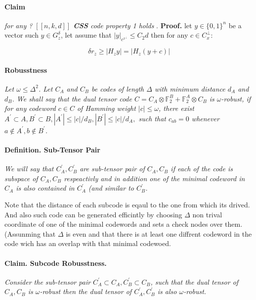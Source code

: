 \documentclass{article}
\newcommand{\Gz}{ G_{z}^{\delta} }
\begin{document}
\begin{multicols*}{2}
	\paragraph{Claim} \textit{ for any ?  $ \left[ \left[ n,k,d \right] \right] $ \textbf{CSS} code property 1 holds }. 
\textbf{Proof.} let $y \in \{0,1\}^{n}$ be a vector such $ y \in \Gz $, let assume that $|y|_{c^{x^{\perp}}} \le C_{2} d$ then for any $ c \in C_{x}^{\perp}$: 

\begin{equation*}
    \delta r_z \ge | H_{z} y | = | H_{z} \left( y + c \right) |  
\end{equation*}
\paragraph{Robusstness} \textit{ Let $ \omega \le \Delta^{2}$. Let $C_{A}$ and $C_{B}$ be codes of length $\Delta$ with minimum distance $d_{A}$ and $d_{B}$. We shall say that the dual tensor code $C = C_{A}\otimes \mathbb{F}^{B}_{2} + \mathbb{F}^{A}_{2} \otimes C_{B}$ is $\omega$-robust, if for any codeword $c\in C$ of Hamming weight $|c|\le \omega$, there exist $A^{\prime}\subset A, B^{\prime}\subset B, |A^{\prime}|\le |c|/d_{B}, |B^{\prime}|\le |c|/d_{A},$ such that $c_{ab}=0$ whenever $a \notin A^{\prime}, b \notin B^{\prime}$.} 
\paragraph{Definition. Sub-Tensor Pair} \textit{ We will say that $C_{A}^{\prime}, C_{B}^{\prime}$ are sub-tensor pair of $C_A,C_B$ if each of the code is subspace of $C_A, C_B$ respeactivly and in addition one of the  minimal codeword in $C_{A}$ is also contained in $C_{A}^{\prime}$ (and similar to $C_{B}^{\prime}$.}

  Note that the distance of each subcode is eqaul to the one from which its drived. And also such code can be generated efficintly by choosing $\Delta$ non trival coordinate of one of the minimal codewords and sets a check nodes over them. (Assunming that $\Delta$ is even and that there is at least one diffrent codeword in the code wich has an overlap with that minimal codewoed.    

 \paragraph{Claim. Subcode Robusstness.} \textit{ Consider the sub-tensor pair $C_{A}^{\prime}\subset C_{A}, C_{B}^{\prime}\subset C_{B}$, such that the dual tensor of $C_{A}, C_{B}$ is $\omega$-robust then the dual tensor of $C_{A}^{\prime}, C_{B}^{\prime}$ is also $\omega$-robust.} 

\end{multicols*}
\end{document}
